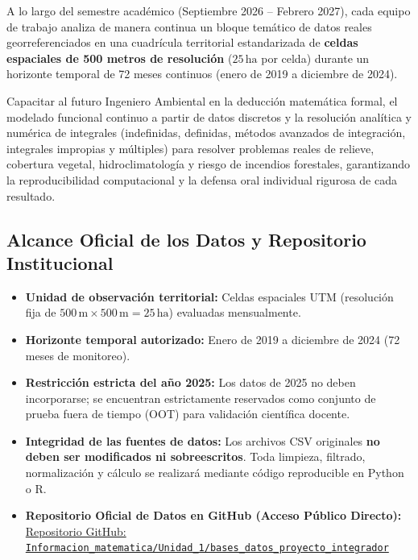 \documentclass[11pt,a4paper]{article}
\begin{document}
A lo largo del semestre académico (Septiembre 2026 -- Febrero 2027), cada equipo de trabajo analiza de manera continua un bloque temático de datos reales georreferenciados en una cuadrícula territorial estandarizada de \textbf{celdas espaciales de 500 metros de resolución} ($25\,\text{ha}$ por celda) durante un horizonte temporal de 72 meses continuos (enero de 2019 a diciembre de 2024).

\begin{conceptbox}[title=Propósito Formativo del Proyecto Integrador]
Capacitar al futuro Ingeniero Ambiental en la deducción matemática formal, el modelado funcional continuo a partir de datos discretos y la resolución analítica y numérica de integrales (indefinidas, definidas, métodos avanzados de integración, integrales impropias y múltiples) para resolver problemas reales de relieve, cobertura vegetal, hidroclimatología y riesgo de incendios forestales, garantizando la reproducibilidad computacional y la defensa oral individual rigurosa de cada resultado.
\end{conceptbox}

\subsection{Alcance Oficial de los Datos y Repositorio Institucional}
\begin{itemize}[leftmargin=*,itemsep=1.5pt]
  \item \textbf{Unidad de observación territorial:} Celdas espaciales UTM (resolución fija de $500\,\text{m} \times 500\,\text{m} = 25\,\text{ha}$) evaluadas mensualmente.
  \item \textbf{Horizonte temporal autorizado:} Enero de 2019 a diciembre de 2024 (72 meses de monitoreo).
  \item \textbf{Restricción estricta del año 2025:} Los datos de 2025 no deben incorporarse; se encuentran estrictamente reservados como conjunto de prueba fuera de tiempo (OOT) para validación científica docente.
  \item \textbf{Integridad de las fuentes de datos:} Los archivos CSV originales \textbf{no deben ser modificados ni sobreescritos}. Toda limpieza, filtrado, normalización y cálculo se realizará mediante código reproducible en Python o R.
  \item \textbf{Repositorio Oficial de Datos en GitHub (Acceso Público Directo):} \\
  \href{https://github.com/cguillermo79/Informacion_matematica/tree/main/Unidad_1/bases_datos_proyecto_integrador}{Repositorio GitHub: \texttt{Informacion\_matematica/Unidad\_1/bases\_datos\_proyecto\_integrador}}
\end{itemize}
\end{document}
